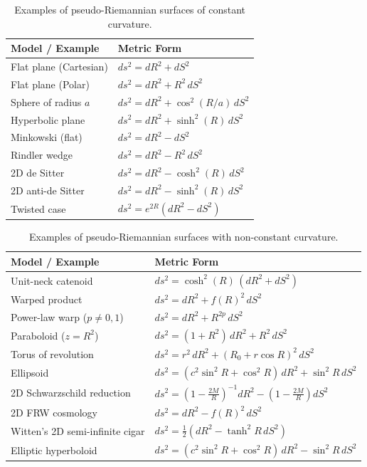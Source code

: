 \documentclass[12pt]{amsart}
\begin{document}
\begin{table}[h]
  \centering
  \renewcommand{\arraystretch}{1.25}
  \begin{tabular}{ll}
    \hline
    \textbf{Model / Example} & \textbf{Metric Form} \\
    \hline
    Flat plane (Cartesian)   & $ds^2 = dR^2 + dS^2$ \\
    Flat plane (Polar)       & $ds^2 = dR^2 + R^2\,dS^2$ \\
    Sphere of radius $a$     & $ds^2 = dR^2 + \cos^2(R/a)\,dS^2$ \\
    Hyperbolic plane         & $ds^2 = dR^2 + \sinh^2(R)\,dS^2$ \\
    \hline
    Minkowski (flat)         & $ds^2 = dR^2 - dS^2$ \\
    Rindler wedge            & $ds^2 = dR^2 - R^2\,dS^2$ \\
    2D de Sitter             & $ds^2 = dR^2 - \cosh^2(R)\,dS^2$ \\
    2D anti-de Sitter        & $ds^2 = dR^2 - \sinh^2(R)\,dS^2$ \\
    Twisted case             & $ds^2 = e^{2R}(dR^2 - dS^2)$ \\
    \hline
  \end{tabular}
  \caption{Examples of pseudo-Riemannian surfaces of constant curvature.}
  \label{tab:2d-metrics-R}
\end{table}

\begin{table}[h]
  \centering
  \renewcommand{\arraystretch}{1.25}
  \begin{tabular}{ll}
    \hline
    \textbf{Model / Example} & \textbf{Metric Form} \\
    \hline
    Unit-neck catenoid    & $ds^2 = \cosh^{2}(R)\,(dR^2 + dS^2)$ \\
    Warped product        & $ds^2 = dR^2 + f(R)^{2}\,dS^2$ \\
    Power-law warp ($p\neq 0,1$) & $ds^2 = dR^2 + R^{2p}\,dS^2$ \\
    Paraboloid ($z=R^2$)  & $ds^2 = (1+R^{2})\,dR^2 + R^2\,dS^2$ \\
    Torus of revolution   &
      $ds^2 = r^2\,dR^2 + (R_0 + r\cos R)^2\,dS^2$ \\
    Ellipsoid             &
      $ds^2 = (c^2\sin^2 R + \cos^2 R)\,dR^2 + \sin^2 R\,dS^2$ \\
    \hline
    2D Schwarzschild reduction &
      $ds^2 = \left(1-\tfrac{2M}{R}\right)^{-1} dR^2
            - \left(1-\tfrac{2M}{R}\right) dS^2$ \\
    2D FRW cosmology      & $ds^2 = dR^2 - f(R)^2\,dS^2$ \\
    Witten's 2D semi-infinite cigar &
      $ds^2 = \tfrac{1}{2}(dR^2 - \tanh^{2}R\,dS^2)$ \\
    Elliptic hyperboloid  &
      $ds^2 = (c^2\sin^2 R+\cos^2 R)\,dR^2 - \sin^2 R\,dS^2$ \\
    \hline
  \end{tabular}
  \caption{Examples of pseudo-Riemannian surfaces with non-constant curvature.}
  \label{tab:2d-metrics-R-nonconst}
\end{table}
\end{document}
